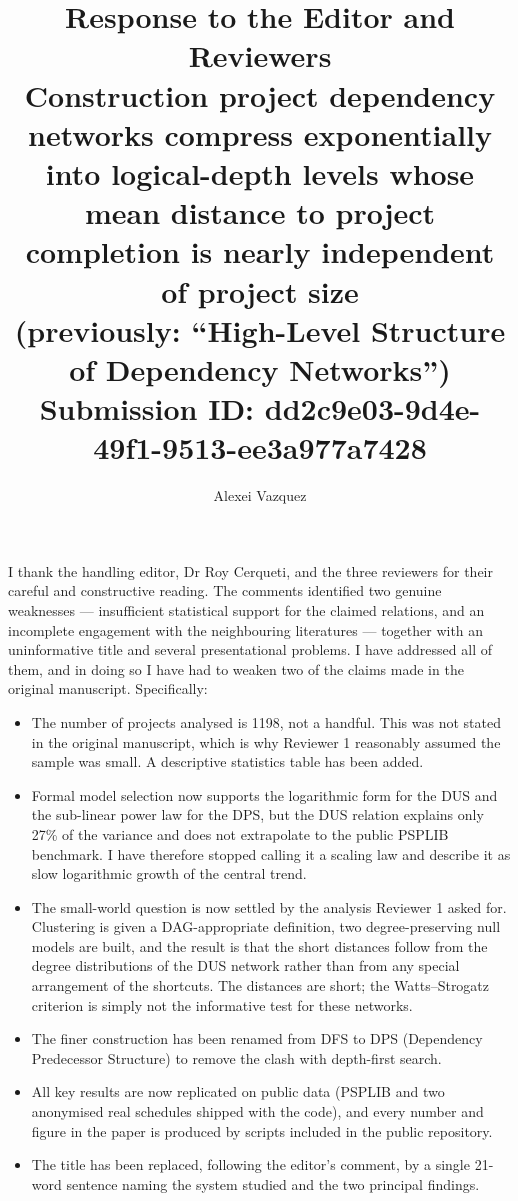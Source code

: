 \documentclass[11pt,a4paper]{article}
\title{Response to the Editor and Reviewers\\
\large Construction project dependency networks compress exponentially into
logical-depth levels whose mean distance to project completion is nearly
independent of project size\\
\normalsize (previously: ``High-Level Structure of Dependency Networks'')\\
\normalsize Submission ID: dd2c9e03-9d4e-49f1-9513-ee3a977a7428}
\author{Alexei Vazquez}
\date{}
\begin{document}
\maketitle

I thank the handling editor, Dr Roy Cerqueti, and the three reviewers for their
careful and constructive reading. The comments identified two genuine weaknesses
--- insufficient statistical support for the claimed relations, and an
incomplete engagement with the neighbouring literatures --- together with an
uninformative title and several presentational problems. I have addressed all of
them, and in doing so I have had to weaken two of the claims made in the
original manuscript. Specifically:

\begin{itemize}
\item The number of projects analysed is 1198, not a handful. This was not
stated in the original manuscript, which is why Reviewer 1 reasonably assumed
the sample was small. A descriptive statistics table has been added.
\item Formal model selection now supports the logarithmic form for the DUS and
the sub-linear power law for the DPS, but the DUS relation explains only 27\%
of the variance and does not extrapolate to the public PSPLIB benchmark. I have
therefore stopped calling it a scaling law and describe it as slow logarithmic
growth of the central trend.
\item The small-world question is now settled by the analysis Reviewer 1 asked
for. Clustering is given a DAG-appropriate definition, two degree-preserving
null models are built, and the result is that the short distances follow from
the degree distributions of the DUS network rather than from any special
arrangement of the shortcuts. The distances are short; the Watts--Strogatz
criterion is simply not the informative test for these networks.
\item The finer construction has been renamed from DFS to DPS (Dependency
Predecessor Structure) to remove the clash with depth-first search.
\item All key results are now replicated on public data (PSPLIB and two
anonymised real schedules shipped with the code), and every number and figure
in the paper is produced by scripts included in the public repository.
\item The title has been replaced, following the editor's comment, by a single
21-word sentence naming the system studied and the two principal findings.
\end{itemize}
\end{document}
